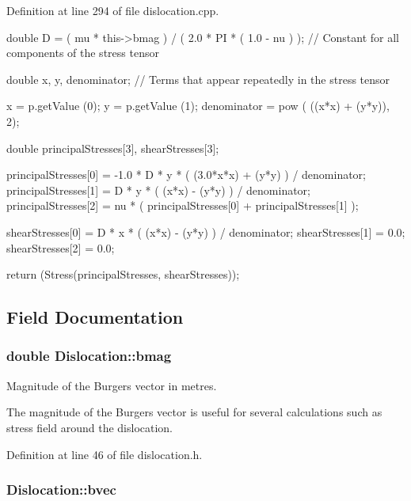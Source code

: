 \-Definition at line 294 of file dislocation.\-cpp.


\begin{DoxyCode}
{
  double D = ( mu * this->bmag ) / ( 2.0 * PI * ( 1.0 - nu ) ); // Constant for
       all components of the stress tensor
  
  double x, y, denominator;     // Terms that appear repeatedly in the stress
       tensor
  
  x = p.getValue (0);
  y = p.getValue (1);
  denominator = pow ( ((x*x) + (y*y)), 2);

  double principalStresses[3], shearStresses[3];
  
  principalStresses[0] = -1.0 * D * y * ( (3.0*x*x) + (y*y) ) / denominator;
  principalStresses[1] = D * y * ( (x*x) - (y*y) ) / denominator;
  principalStresses[2] = nu * ( principalStresses[0] + principalStresses[1] );
  
  shearStresses[0] = D * x * ( (x*x) - (y*y) ) / denominator;
  shearStresses[1] = 0.0;
  shearStresses[2] = 0.0;
  
  return (Stress(principalStresses, shearStresses));
}
\end{DoxyCode}


\subsection{\-Field \-Documentation}
\hypertarget{classDislocation_a2b0284639af7fdfdf44fa0ef7fc1632e}{
\subsubsection[{bmag}]{\setlength{\rightskip}{0pt plus 5cm}double {\bf \-Dislocation\-::bmag}}}\label{d3/dc6/classDislocation_a2b0284639af7fdfdf44fa0ef7fc1632e}


\-Magnitude of the \-Burgers vector in metres. 

\-The magnitude of the \-Burgers vector is useful for several calculations such as stress field around the dislocation. 

\-Definition at line 46 of file dislocation.\-h.

\hypertarget{classDislocation_aad45c2eaade195f374707afb648ed17e}{
\subsubsection[{bvec}]{ {\bf \-Dislocation\-::bvec}}}\label{d3/dc6/classDislocation_aad45c2eaade195f374707afb648ed17e}


